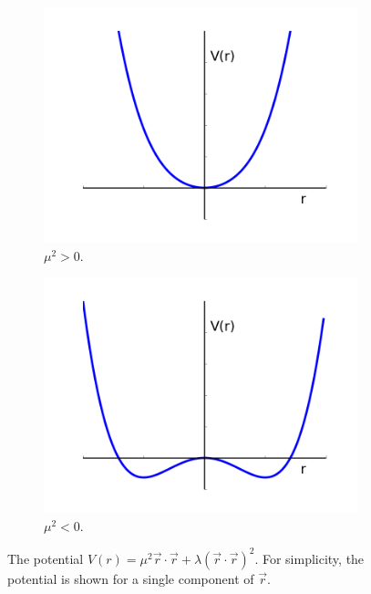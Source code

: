 \begin{figure}[htbp]
  \centering
  \begin{subfigure}{0.45\textwidth}
    \centering
    \includegraphics[width=\textwidth]{higgs_pot_mup}
    \caption{$\mu^{2}>0$.}
    \label{fig:higgs_pot_mup}
  \end{subfigure}
  \begin{subfigure}{0.45\textwidth}
    \centering
    \includegraphics[width=\textwidth]{higgs_pot_mum}
    \caption{$\mu^{2}<0$.}
    \label{fig:higgs_pot_mum}
  \end{subfigure}
  \caption[The potential $ V(r) = \mu^{2} \vec{r} \cdot \vec{r} + \lambda (
\vec{r} \cdot \vec{r} )^{2}$.] {The potential $ V(r) = \mu^{2} \vec{r} \cdot
\vec{r} + \lambda ( \vec{r} \cdot \vec{r} )^{2}$. For simplicity, the potential
is shown for a single component of $\vec{r}$.}
  \label{fig:higgs_pot}
\end{figure}


